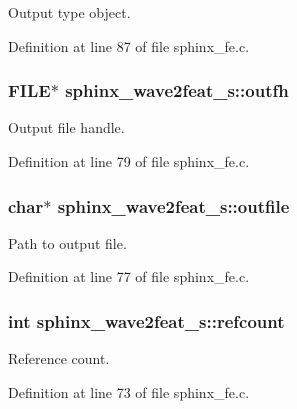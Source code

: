 Output type object. 



Definition at line 87 of file sphinx\+\_\+fe.\+c.

\subsubsection[{outfh}]{\setlength{\rightskip}{0pt plus 5cm}F\+I\+L\+E$\ast$ sphinx\+\_\+wave2feat\+\_\+s\+::outfh}\label{structsphinx__wave2feat__s_ad7340fab24fb182cbff2c73fd1fb3671}


Output file handle. 



Definition at line 79 of file sphinx\+\_\+fe.\+c.

\subsubsection[{outfile}]{\setlength{\rightskip}{0pt plus 5cm}char$\ast$ sphinx\+\_\+wave2feat\+\_\+s\+::outfile}\label{structsphinx__wave2feat__s_aa50405dc75074933912da57295ec5fbf}


Path to output file. 



Definition at line 77 of file sphinx\+\_\+fe.\+c.

\subsubsection[{refcount}]{\setlength{\rightskip}{0pt plus 5cm}int sphinx\+\_\+wave2feat\+\_\+s\+::refcount}\label{structsphinx__wave2feat__s_ae9b2fc4bfa6a3adbf2ee5a71796cdb51}


Reference count. 



Definition at line 73 of file sphinx\+\_\+fe.\+c.

